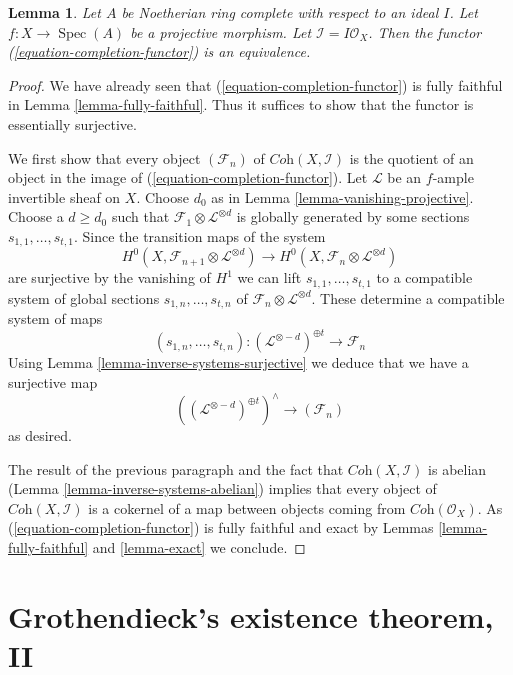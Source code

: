 \documentclass{stacks-project}
\theoremstyle{plain}
\newtheorem{lemma}[subsection]{Lemma}
\theoremstyle{definition}
\theoremstyle{remark}
\numberwithin{equation}{subsection}
\def\Spec{\mathop{\mathrm{Spec}}}
\begin{document}
\begin{lemma}
\label{lemma-existence-projective}
Let $A$ be Noetherian ring complete with respect to an ideal $I$.
Let $f : X \to \Spec(A)$ be a projective morphism. Let
$\mathcal{I} = I\mathcal{O}_X$.
Then the functor (\ref{equation-completion-functor}) is an equivalence.
\end{lemma}

\begin{proof}
We have already seen that (\ref{equation-completion-functor}) is
fully faithful in Lemma \ref{lemma-fully-faithful}. Thus it suffices
to show that the functor is essentially surjective.

\medskip\noindent
We first show that every object $(\mathcal{F}_n)$ of
$\textit{Coh}(X, \mathcal{I})$ is the quotient of an object
in the image of (\ref{equation-completion-functor}). 
Let $\mathcal{L}$ be an $f$-ample invertible sheaf on $X$.
Choose $d_0$ as in Lemma \ref{lemma-vanishing-projective}.
Choose a $d \geq d_0$ such that
$\mathcal{F}_1 \otimes \mathcal{L}^{\otimes d}$
is globally generated by some sections $s_{1, 1}, \ldots, s_{t, 1}$.
Since the transition maps of the system
$$
H^0(X, \mathcal{F}_{n + 1} \otimes \mathcal{L}^{\otimes d})
\longrightarrow
H^0(X, \mathcal{F}_n \otimes \mathcal{L}^{\otimes d})
$$
are surjective by the vanishing of $H^1$ we can lift
$s_{1, 1}, \ldots, s_{t, 1}$ to a compatible system of global sections
$s_{1, n}, \ldots, s_{t, n}$ of
$\mathcal{F}_n \otimes \mathcal{L}^{\otimes d}$.
These determine a compatible system of maps
$$
(s_{1, n}, \ldots, s_{t, n}) :
(\mathcal{L}^{\otimes -d})^{\oplus t} \longrightarrow \mathcal{F}_n
$$
Using Lemma \ref{lemma-inverse-systems-surjective}
we deduce that we have a surjective map
$$
\left((\mathcal{L}^{\otimes -d})^{\oplus t}\right)^\wedge
\longrightarrow
(\mathcal{F}_n)
$$
as desired.

\medskip\noindent
The result of the previous paragraph and the fact that
$\textit{Coh}(X, \mathcal{I})$ is abelian
(Lemma \ref{lemma-inverse-systems-abelian})
implies that
every object of $\textit{Coh}(X, \mathcal{I})$ is a cokernel
of a map between objects coming from $\textit{Coh}(\mathcal{O}_X)$.
As (\ref{equation-completion-functor}) is fully faithful and exact by
Lemmas \ref{lemma-fully-faithful} and \ref{lemma-exact}
we conclude.
\end{proof}








\section{Grothendieck's existence theorem, II}
\label{section-existence-proper}
\end{document}
